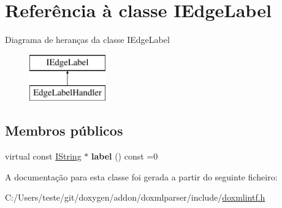 \hypertarget{class_i_edge_label}{\section{Referência à classe I\-Edge\-Label}
\label{class_i_edge_label}
}
Diagrama de heranças da classe I\-Edge\-Label\begin{figure}[H]
\begin{center}
\leavevmode
\includegraphics[height=2.000000cm]{class_i_edge_label}
\end{center}
\end{figure}
\subsection*{Membros públicos}
\begin{DoxyCompactItemize}
\item 
\hypertarget{class_i_edge_label_adff3c8a34a7b7f000c1a12aaf919b5f7}{virtual const \hyperlink{class_i_string}{I\-String} $\ast$ {\bfseries label} () const =0}\label{class_i_edge_label_adff3c8a34a7b7f000c1a12aaf919b5f7}

\end{DoxyCompactItemize}


A documentação para esta classe foi gerada a partir do seguinte ficheiro\-:\begin{DoxyCompactItemize}
\item 
C\-:/\-Users/teste/git/doxygen/addon/doxmlparser/include/\hyperlink{include_2doxmlintf_8h}{doxmlintf.\-h}\end{DoxyCompactItemize}
